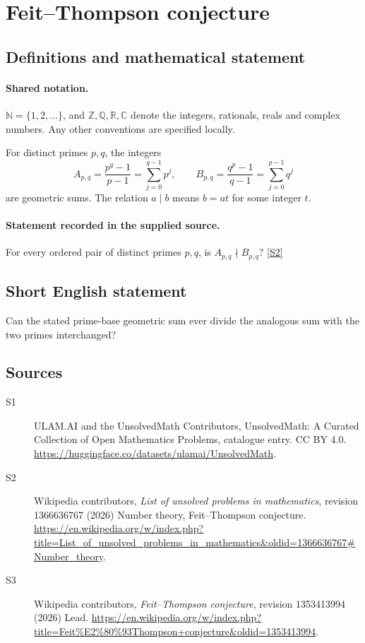 \documentclass[11pt]{article}
\newcommand{\sref}[2]{\hyperlink{source:#1:#2}{[S#2]}}
\begin{document}
\section{Feit–Thompson conjecture}\label{statement}

\subsection{Definitions and mathematical statement}

\paragraph{Shared notation.}$\mathbb N=\{1,2,\ldots\}$, and $\mathbb Z,\mathbb Q,\mathbb R,\mathbb C$ denote the integers, rationals, reals and complex numbers. Any other conventions are specified locally.


For distinct primes $p,q$, the integers
\[
A_{p,q}=\frac{p^q-1}{p-1}=\sum_{j=0}^{q-1}p^j,\qquad B_{p,q}=\frac{q^p-1}{q-1}=\sum_{j=0}^{p-1}q^j
\]
are geometric sums. The relation $a\mid b$ means $b=at$ for some integer $t$.
\paragraph{Statement recorded in the supplied source.}
For every ordered pair of distinct primes $p,q$, is $A_{p,q}\nmid B_{p,q}$? \sref{statement}{2}
\subsection{Short English statement}
Can the stated prime-base geometric sum ever divide the analogous sum with the two primes interchanged?
\subsection{Sources}
\begin{description}
\item[\hypertarget{source:statement:1}{S1}] ULAM.AI and the UnsolvedMath Contributors, UnsolvedMath: A Curated Collection of Open Mathematics Problems, catalogue entry. CC BY 4.0. \url{https://huggingface.co/datasets/ulamai/UnsolvedMath}.
\item[\hypertarget{source:statement:2}{S2}] Wikipedia contributors, \emph{List of unsolved problems in mathematics}, revision 1366636767 (2026) Number theory, Feit–Thompson conjecture. \url{https://en.wikipedia.org/w/index.php?title=List_of_unsolved_problems_in_mathematics&oldid=1366636767#Number_theory}.
\item[\hypertarget{source:statement:3}{S3}] Wikipedia contributors, \emph{Feit–Thompson conjecture}, revision 1353413994 (2026) Lead. \url{https://en.wikipedia.org/w/index.php?title=Feit%E2%80%93Thompson+conjecture&oldid=1353413994}.
\end{description}
\label{end:statement}
\end{document}
